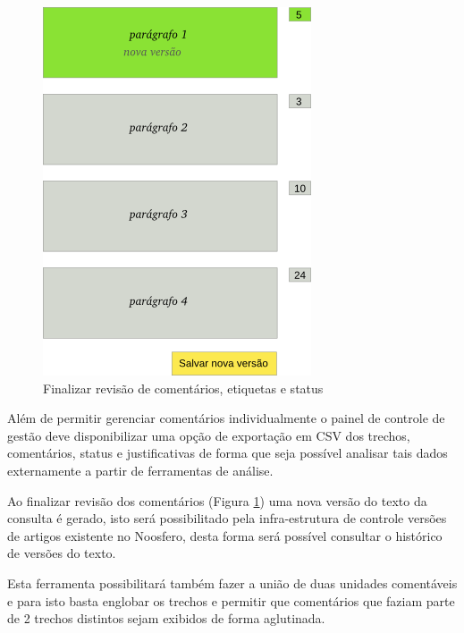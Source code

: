 \documentclass[12pt]{article}
\begin{document}
\begin{figure}[h]
\center
\includegraphics[scale=0.3]{manage-comments-commit.png}
\caption{Finalizar revisão de comentários, etiquetas e status}
\label{manage-comments-commit}
\end{figure}

Além de permitir gerenciar comentários individualmente o painel de
controle de gestão deve disponibilizar uma opção de exportação em CSV dos
trechos, comentários, status e justificativas de forma que seja possível
analisar tais dados externamente a partir de ferramentas de análise.

Ao finalizar revisão dos comentários (Figura \ref{manage-comments-commit}) uma
nova versão do texto da consulta é gerado, isto será possibilitado pela
infra-estrutura de controle versões de artigos existente no Noosfero, desta
forma será possível consultar o histórico de versões do texto.

Esta ferramenta possibilitará também fazer a união de duas unidades
comentáveis e para isto basta englobar os trechos e permitir que comentários
que faziam parte de 2 trechos distintos sejam exibidos de forma aglutinada.

%
%
\end{document}
